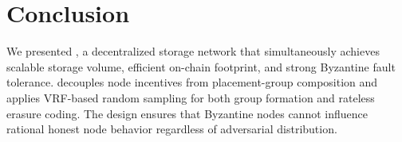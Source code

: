 \section{Conclusion}

We presented \sys, a decentralized storage network that simultaneously achieves scalable storage volume, efficient on-chain footprint, and strong Byzantine fault tolerance.
\sys decouples node incentives from placement-group composition and applies VRF-based random sampling for both group formation and rateless erasure coding.
The design ensures that Byzantine nodes cannot influence rational honest node behavior regardless of adversarial distribution.
